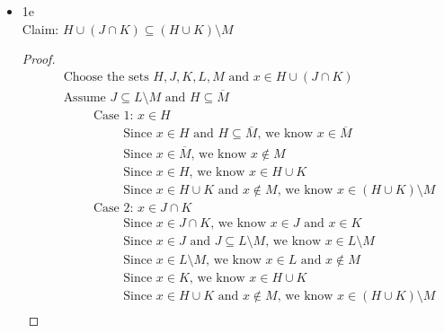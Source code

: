\documentclass{article}
\begin{document}
\begin{itemize}
\begin{itemize}
\begin{proof}
\begin{align}
            \end{align}
        \end{proof}
        \item 1e \\
        Claim: $H \cup (J \cap K) \subseteq (H \cup K) \setminus M$
        \begin{proof}
            \begin{align}
                &\quad \text{Choose the sets } H, J, K, L, M \text{ and } x \in H \cup (J \cap K) \\
                &\quad \text{Assume } J \subseteq L \setminus M \text{ and } H \subseteq \overline{M} \\
                &\quad \hspace{1cm} \text{Case 1: } x \in H \\
                &\quad \hspace{2cm} \text{Since } x \in H \text{ and } H \subseteq \overline{M} \text{, we know } x \in \overline{M} \\
                &\quad \hspace{2cm} \text{Since } x \in \overline{M} \text{, we know } x \notin M \\
                &\quad \hspace{2cm} \text{Since } x \in H \text{, we know } x \in H \cup K \\
                &\quad \hspace{2cm} \text{Since } x \in H \cup K \text{ and } x \notin M \text{, we know } x \in (H \cup K) \setminus M \\
                &\quad \hspace{1cm} \text{Case 2: } x \in J \cap K \\
                &\quad \hspace{2cm} \text{Since } x \in J \cap K \text{, we know } x \in J \text{ and } x \in K \\
                &\quad \hspace{2cm} \text{Since } x \in J \text{ and } J \subseteq L \setminus M \text{, we know } x \in L \setminus M \\
                &\quad \hspace{2cm} \text{Since } x \in L \setminus M \text{, we know } x \in L \text{ and } x \notin M \\
                &\quad \hspace{2cm} \text{Since } x \in K \text{, we know } x \in H \cup K \\
                &\quad \hspace{2cm} \text{Since } x \in H \cup K \text{ and } x \notin M \text{, we know } x \in (H \cup K) \setminus M \\

\end{align}
\end{proof}
\end{itemize}
\end{itemize}
\end{document}
